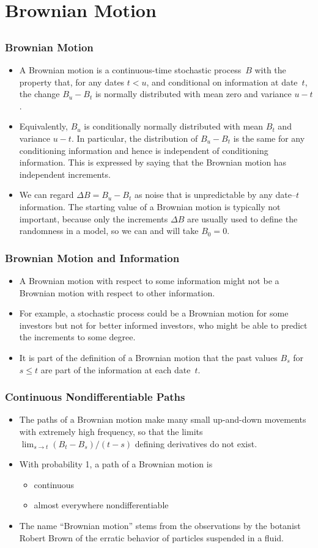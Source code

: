 \documentclass[10pt]{beamer}
\newcommand{\bi}{\begin{itemize}}
\newcommand{\ei}{\end{itemize}}
\newcommand{\im}{\item}
\newcommand{\bfr}{\begin{frame}}
\begin{document}
\section{Brownian Motion}
\subsection{}

\bfr\frametitle{Brownian Motion}
\bi
\im A Brownian motion  is a continuous-time stochastic process~$B$ with the property that, for any dates $t<u$, and \alert{conditional on information at date~$t$, the change $B_u-B_t$ is normally distributed with mean zero and variance $u-t$}. 
\im Equivalently, \alert{$B_u$ is conditionally normally distributed with mean $B_t$ and variance $u-t$}.  In particular, the distribution of $B_u-B_t$ is the same for any conditioning information and hence is independent of conditioning information.  This is expressed by saying that the Brownian motion has \alert{independent increments}.  
\im We can regard \alert{$\Delta B = B_u-B_t$ as noise that is unpredictable by any date--$t$ information}.  The starting value of a Brownian motion is typically not important, because only the increments $\Delta B$ are usually used to define the randomness in a model, so we can and will take $B_0=0$.
\ei
\end{frame}

\bfr\frametitle{Brownian Motion and Information}
\bi
\im A Brownian motion with respect to some information might not be a Brownian motion with respect to other information.  
\im For example, a stochastic process could be a Brownian motion for some investors but not for better informed investors, who might be able to predict the increments to some degree.  
\im It is part of the definition of a Brownian motion that the past values $B_s$ for $s \leq t$ are part of the information  at each date~$t$.
\ei
\end{frame}

\bfr\frametitle{Continuous Nondifferentiable Paths}
\bi
\im The paths of a Brownian motion make many small up-and-down movements with extremely high frequency, so that the limits $\lim_{s\rightarrow t} (B_t-B_s)/(t-s)$ defining derivatives do not exist.  
\im With probability 1, a path of a Brownian motion is
\bi
\im continuous
\im almost everywhere \alert{nondifferentiable}
\ei
\im The name ``Brownian motion'' stems from the  observations by the botanist Robert Brown of the erratic behavior of particles suspended in a fluid.  
\ei
\end{frame}
\end{document}
